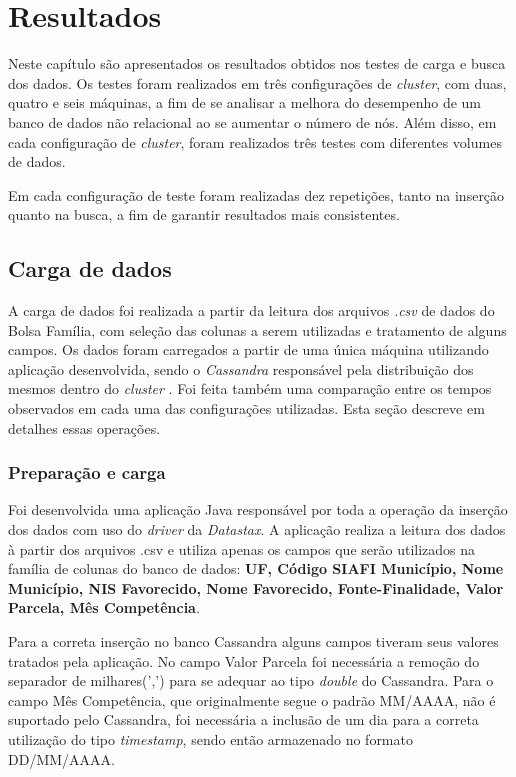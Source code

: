 \chapter{Resultados}

Neste capítulo são apresentados os resultados obtidos nos testes de carga e busca dos dados. Os testes foram realizados em três configurações de \emph{cluster}, com duas, quatro e seis máquinas, a fim de se analisar a melhora do desempenho de um banco de dados não relacional ao se aumentar o número de nós. Além disso, em cada configuração de \emph{cluster}, foram realizados três testes com diferentes volumes de dados. 

Em cada configuração de teste foram realizadas dez repetições, tanto na inserção quanto na busca, a fim de garantir resultados mais consistentes. 

\section{Carga de dados}
A carga de dados foi realizada a partir da leitura dos arquivos \emph{.csv} de dados do Bolsa Família, com seleção das colunas a serem utilizadas e tratamento de alguns campos.
Os dados foram carregados a partir de uma única máquina utilizando aplicação desenvolvida, sendo o \emph{Cassandra} responsável pela distribuição dos mesmos dentro do \emph{cluster} . Foi feita também uma comparação entre os tempos observados em cada uma das configurações utilizadas. Esta seção descreve em detalhes essas operações.

\subsection{Preparação e carga}
Foi desenvolvida uma aplicação Java responsável por toda a operação da inserção dos dados com uso do \emph{driver} da \emph{Datastax}. A aplicação realiza a leitura dos dados à partir dos arquivos .csv e utiliza apenas os campos que serão utilizados na família de colunas do banco de dados: \textbf{UF, Código SIAFI Município, Nome Município, NIS Favorecido, Nome Favorecido, Fonte-Finalidade, Valor Parcela, Mês Competência}. 

Para a correta inserção no banco Cassandra alguns campos tiveram seus valores tratados pela aplicação. No campo Valor Parcela foi necessária a remoção do separador de milhares(',') para se adequar ao tipo \emph{double} do Cassandra. Para o campo Mês Competência, que originalmente segue o padrão MM/AAAA, não é suportado pelo Cassandra, foi necessária a inclusão de um dia para a correta utilização do tipo \emph{timestamp}, sendo então armazenado no formato DD/MM/AAAA.

